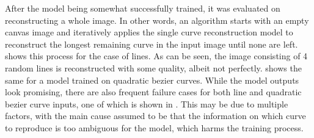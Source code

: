 After the model being somewhat successfully trained, it was evaluated on reconstructing a whole image. In other words, an algorithm starts with an empty canvas image and iteratively applies the single curve reconstruction model to reconstruct the longest remaining curve in the input image until none are left.  shows this process for the case of lines. As can be seen, the image consisting of 4 random lines is reconstructed with some quality, albeit not perfectly.  shows the same for a model trained on quadratic bezier curves. While the model outputs look promising, there are also frequent failure cases for both line and quadratic bezier curve inputs, one of which is shown in . This may be due to multiple factors, with the main cause assumed to be that the information on which curve to reproduce is too ambiguous for the model, which harms the training process.

